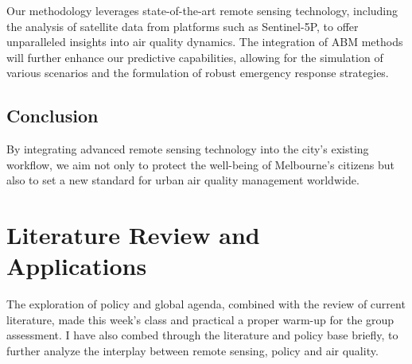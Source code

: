 \documentclass[
  letterpaper,
  DIV=11,
  numbers=noendperiod]{scrreprt}
\begin{document}
Our methodology leverages state-of-the-art remote sensing technology,
including the analysis of satellite data from platforms such as
Sentinel-5P, to offer unparalleled insights into air quality dynamics.
The integration of ABM methods will further enhance our predictive
capabilities, allowing for the simulation of various scenarios and the
formulation of robust emergency response strategies.

\hypertarget{conclusion}{%
\subsection*{Conclusion}\label{conclusion}}

By integrating advanced remote sensing technology into the city's
existing workflow, we aim not only to protect the well-being of
Melbourne's citizens but also to set a new standard for urban air
quality management worldwide.

\hypertarget{literature-review-and-applications-2}{%
\section*{Literature Review and
Applications}\label{literature-review-and-applications-2}}


The exploration of policy and global agenda, combined with the review of
current literature, made this week's class and practical a proper
warm-up for the group assessment. I have also combed through the
literature and policy base briefly, to further analyze the interplay
between remote sensing, policy and air quality.
\end{document}

